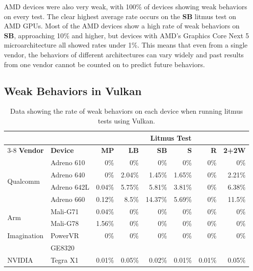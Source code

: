 AMD devices were also very weak, with 100\% of devices showing weak behaviors on every test. The clear highest average rate occurs on the \textbf{SB} litmus test on AMD GPUs. Most of the AMD devices show a high rate of weak behaviors on \textbf{SB}, approaching 10\% and higher, but devices with AMD's Graphics Core Next 5 microarchitecture all showed rates under 1\%. This means that even from a single vendor, the behaviors of different architectures can vary widely and past results from one vendor cannot be counted on to predict future behaviors.

\subsection{Weak Behaviors in Vulkan \label{sec:gpuharbor-vulkan-weak}}

\begin{table}
\footnotesize
\centering
\caption{Data showing the rate of weak behaviors on each device when running litmus tests using Vulkan.}
\begingroup
{}
\begin{tabular}{ l l r r r r r r }
 \toprule
 & & \multicolumn{6}{c}{\textbf{Litmus Test}} \\
\cmidrule(lr){3-8}
\textbf{Vendor} & \textbf{Device} & \textbf{MP} & \textbf{LB} & \textbf{SB} & \textbf{S} & \textbf{R} & \textbf{2+2W} \\
\midrule
\multirow{4}{*}{Qualcomm} & Adreno 610 & 0\% & 0\% & 0\% & 0\% & 0\% & 0\% \\
& Adreno 640 & 0\% & 2.04\% & 1.45\% & 1.65\% & 0\% & 2.21\% \\
& Adreno 642L & 0.04\% & 5.75\% & 5.81\% & 3.81\% & 0\% & 6.38\% \\
& Adreno 660 & 0.12\% & 8.5\% & 14.37\% & 5.69\% & 0\% & 11.5\% \\
\midrule
\multirow{2}{*}{Arm} & Mali-G71 & 0.04\% & 0\% & 0\% & 0\% & 0\% & 0\% \\
& Mali-G78 & 1.56\% & 0\% & 0\% & 0\% & 0\% & 0\% \\
\midrule
Imagination & PowerVR  & 0\% & 0\% & 0\% & 0\% & 0\% & 0\% \\
& GE8320 & & & & & & \\
\midrule
NVIDIA & Tegra X1 & 0.01\% & 0.05\% & 0.02\% & 0.01\% & 0.01\% & 0.05\% \\
 \bottomrule
\end{tabular}
\endgroup
\label{tab:gpuharbor-vulkan-rates}
\end{table}

